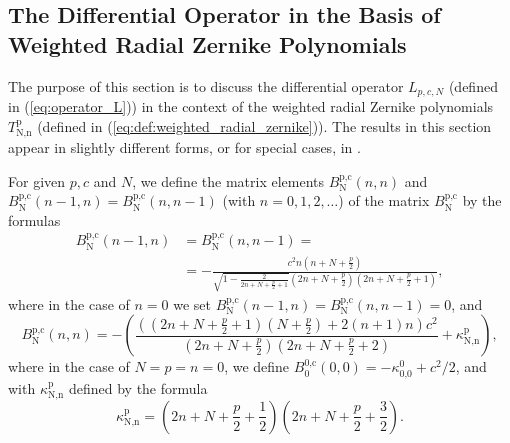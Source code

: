 \documentclass[12pt]{article}
\begin{document}
%
% 
%
\subsection{The Differential Operator in the Basis of Weighted Radial Zernike Polynomials}

The purpose of this section is to discuss the differential operator $L_{p,c,N}$ (defined in (\ref{eq:operator_L})) in the context of the 
weighted radial Zernike polynomials $T_{\text{N,n}}^{\text{p}}$ (defined in (\ref{eq:def:weighted_radial_zernike})). 
The results in this section appear in slightly different forms, or for special cases, in \cite{slepian1964prolate,shkolnisky2007prolate,serkh2015generalized}.

For given $p,c$ and $N$, we define the matrix elements $B_{\text{N}}^{\text{p,c}}(n,n)$ and $B_{\text{N}}^{\text{p,c}}(n-1,n)=B_{\text{N}}^{\text{p,c}}(n,n-1)$
(with $n=0,1,2,\ldots$) of the matrix $B_{\text{N}}^{\text{p,c}}$ by the formulas
\begin{equation}\label{eq:Bmat_nm1n}
\begin{split}
B_{\text{N}}^{\text{p,c}}(n-1,n)&=B_{\text{N}}^{\text{p,c}}(n,n-1)= \\
&=-\frac{c^2 n \left(n+N+\frac{p}{2}\right)}{\sqrt{1-\frac{2}{2 n+N+\frac{p}{2}+1}} \left(2 n+N+\frac{p}{2}\right) \left(2 n+N+\frac{p}{2}+1\right)}, 
\end{split}
\end{equation}
where in the case of $n=0$ we set $B_{\text{N}}^{\text{p,c}}(n-1,n)=B_{\text{N}}^{\text{p,c}}(n,n-1)=0$,
and
\begin{equation}\label{eq:Bmat_nn}
B_{\text{N}}^{\text{p,c}}(n,n)=-\left(\frac{\left(\left(2 n+N+\frac{p}{2}+1\right)
   \left(N+\frac{p}{2}\right)+2 (n+1) n\right) c^2}{\left(2 n+N+\frac{p}{2}\right) \left(2
   n+N+\frac{p}{2}+2\right)}+\kappa _{\text{N,n}}^{\text{p}}\right),
\end{equation}
where in the case of $N=p=n=0$, we define $B_{\text{0}}^{\text{0,c}}(0,0) = -\kappa _{\text{0,0}}^{\text{0}} + c^2/2$,
and with $\kappa _{\text{N,n}}^{\text{p}}$ defined by the formula
\begin{equation}
\kappa _{\text{N,n}}^{\text{p}}=\left(2 n+N+\frac{p}{2}+\frac{1}{2}\right) \left(2
   n+N+\frac{p}{2}+\frac{3}{2}\right) .
\end{equation}
\end{document}
